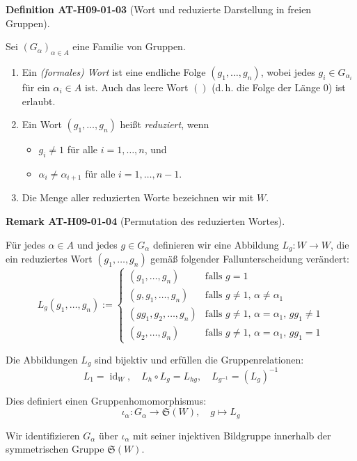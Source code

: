 \documentclass[10pt, letterpaper]{article}
\newcommand{\CustomHeading}[3]{%
  \par\medskip\noindent%
  \textbf{#1 #2} \textnormal{(#3)}.\enskip%
}
\newenvironment{DEF}[2]{\begin{unitbox}\CustomHeading{Definition}{#1}{#2}}{\end{unitbox}}
\newenvironment{REM}[2]{\begin{unitbox}\CustomHeading{Remark}{#1}{#2}}{\end{unitbox}}
\begin{document}
\begin{DEF}{AT-H09-01-03}{Wort und reduzierte Darstellung in freien Gruppen}
Sei $(G_\alpha)_{\alpha \in A}$ eine Familie von Gruppen.
\begin{enumerate}
  \item Ein \emph{(formales) Wort} ist eine endliche Folge $(g_1, \dots, g_n)$, wobei jedes $g_i \in G_{\alpha_i}$ für ein $\alpha_i \in A$ ist. Auch das leere Wort $()$ (d.\,h. die Folge der Länge 0) ist erlaubt.
  
  \item Ein Wort $(g_1, \dots, g_n)$ heißt \emph{reduziert}, wenn
  \begin{itemize}
    \item $g_i \neq 1$ für alle $i = 1, \dots, n$, und
    \item $\alpha_i \neq \alpha_{i+1}$ für alle $i = 1, \dots, n-1$.
  \end{itemize}
  
  \item Die Menge aller reduzierten Worte bezeichnen wir mit $W$.
\end{enumerate}
\end{DEF}


\begin{REM}{AT-H09-01-04}{Permutation des reduzierten Wortes}
Für jedes $\alpha \in A$ und jedes $g \in G_\alpha$ definieren wir eine Abbildung $L_g: W \to W$, die ein reduziertes Wort $(g_1, \dots, g_n)$ gemäß folgender Fallunterscheidung verändert:
\[
L_g(g_1, \dots, g_n) :=
\begin{cases}
(g_1, \dots, g_n) & \text{falls } g = 1 \\
(g, g_1, \dots, g_n) & \text{falls } g \neq 1,\, \alpha \neq \alpha_1 \\
(gg_1, g_2, \dots, g_n) & \text{falls } g \neq 1,\, \alpha = \alpha_1,\, gg_1 \neq 1 \\
(g_2, \dots, g_n) & \text{falls } g \neq 1,\, \alpha = \alpha_1,\, gg_1 = 1
\end{cases}
\]

Die Abbildungen $L_g$ sind bijektiv und erfüllen die Gruppenrelationen:
\[
L_1 = \operatorname{id}_W, \quad L_h \circ L_g = L_{hg}, \quad L_{g^{-1}} = (L_g)^{-1}
\]

Dies definiert einen Gruppenhomomorphismus:
\[
\iota_\alpha: G_\alpha \rightarrow \mathfrak{S}(W), \quad g \mapsto L_g
\]

Wir identifizieren $G_\alpha$ über $\iota_\alpha$ mit seiner injektiven Bildgruppe innerhalb der symmetrischen Gruppe $\mathfrak{S}(W)$.
\end{REM}
\end{document}
